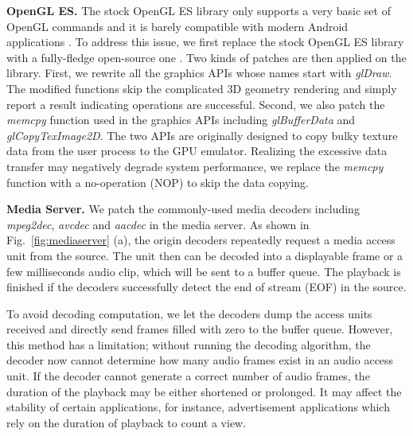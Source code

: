 \documentclass[conference]{IEEEtranl}
\begin{document}
	\textbf{OpenGL ES.}
	The stock OpenGL ES library only supports a very basic set of OpenGL commands and it is barely compatible with modern Android applications \cite{zechner2016android}. To address this issue, 
	we first replace the stock OpenGL ES library with a fully-fledge open-source one \cite{graphics2008mesa3d}.
	Two kinds of patches are then applied on the library. First, we rewrite all the graphics APIs whose names start with \textit{glDraw}. The modified functions skip the complicated 3D geometry rendering and simply report a result indicating operations are successful. 
	Second, we also patch the \textit{memcpy} function used in the graphics APIs including \textit{glBufferData} and \textit{glCopyTexImage2D}. The two APIs are originally designed to copy bulky texture data from the user process to the GPU emulator. Realizing the excessive data transfer may negatively degrade system performance, we replace the \textit{memcpy} function with a no-operation (NOP) to skip the data copying.

	\textbf{Media Server.}
	We patch the commonly-used media decoders including \textit{mpeg2dec}, \textit{avcdec} and \textit{aacdec} in the media server. As shown in Fig.~\ref{fig:mediaserver} (a), the origin decoders repeatedly request a media access unit from the source. The unit then can be decoded into a displayable frame or a few milliseconds audio clip, which will be sent to a buffer queue. The playback is finished if the decoders successfully detect the end of stream (EOF) in the source. 

	To avoid decoding computation, we let the decoders dump the access units received and directly send frames filled with zero to the buffer queue. However, this method has a limitation; without running the decoding algorithm, the decoder now cannot determine how many audio frames exist in an audio access unit. If the decoder cannot generate a correct number of audio frames, the duration of the playback may be either shortened or prolonged. It may affect the stability of certain applications, for instance, advertisement applications which rely on the duration of playback to count a view. 
\end{document}
